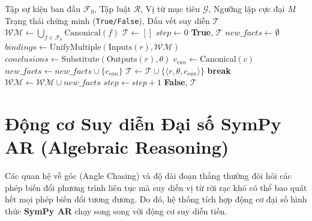 \begin{algorithm}[h!]
\caption{Thuật toán Suy diễn Tiến Hình học Phẳng (Forward Chaining with Canonical Normalization)}
\label{alg:forward_chaining}
\begin{algorithmic}[1]
\Require Tập sự kiện ban đầu $\mathcal{F}_0$, Tập luật $\mathcal{R}$, Vị từ mục tiêu $\mathcal{G}$, Ngưỡng lặp cực đại $M$
\Ensure Trạng thái chứng minh (\texttt{True/False}), Dấu vết suy diễn $\mathcal{T}$
\State $\mathcal{WM} \leftarrow \bigcup_{f \in \mathcal{F}_0} \text{Canonical}(f)$
\State $\mathcal{T} \leftarrow []$
\State $step \leftarrow 0$
        \State \Return \textbf{True}, $\mathcal{T}$ 
    \EndIf
    \State $new\_facts \leftarrow \emptyset$
        \State $bindings \leftarrow \text{UnifyMultiple}(\text{Inputs}(r), \mathcal{WM})$
            \State $conclusions \leftarrow \text{Substitute}(\text{Outputs}(r), \theta)$
                \State $c_{can} \leftarrow \text{Canonical}(c)$
                    \State $new\_facts \leftarrow new\_facts \cup \{c_{can}\}$
                    \State $\mathcal{T} \leftarrow \mathcal{T} \cup \{\langle r, \theta, c_{can} \rangle\}$
                \EndIf
            \EndFor
        \EndFor
    \EndFor
        \State \textbf{break} 
    \EndIf
    \State $\mathcal{WM} \leftarrow \mathcal{WM} \cup new\_facts$
    \State $step \leftarrow step + 1$
\EndWhile
\State \Return \textbf{False}, $\mathcal{T}$
\end{algorithmic}
\end{algorithm}

\section{Động cơ Suy diễn Đại số SymPy AR (Algebraic Reasoning)}
Các quan hệ về góc (Angle Chasing) và độ dài đoạn thẳng thường đòi hỏi các phép biến đổi phương trình liên tục mà suy diễn vị từ rời rạc khó có thể bao quát hết mọi phép biến đổi tương đương. Do đó, hệ thống tích hợp động cơ đại số hình thức \textbf{SymPy AR} chạy song song với động cơ suy diễn tiến.

